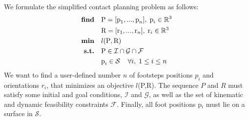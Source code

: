 We formulate the simplified contact planning problem as follows:
\begin{equation}
\label{eq:mip_simple}
\begin{aligned}
    \textrm{\textbf{find}}  \quad & \mbox{P}=[\mbox{p}_1,...,\mbox{p}_n], \;\mbox{p}_i \in \mathbb{R}^{3}\\
                            \quad & \mbox{R}=[\mbox{r}_1,...,\mbox{r}_n], \; \mbox{r}_i \in \mathbb{R}^{3}\\
    \textrm{\textbf{min}}  \quad & l(\mbox{P},\mbox{R})\\
    \textrm{\textbf{s.t.}}  \quad & \mbox{P} \in  \mathcal{I} \cap \mathcal{G} \cap \mathcal{F} \\
                            \quad & \mbox{p}_i \in \mathcal{S} \;\;\;\; \forall i, \; 1 \leq i \leq n
\end{aligned}
\end{equation}
We want to find a user-defined number $n$ of footsteps positions $p_i$ and orientations $r_i$, that minimizes an objective $l$(P,R).
The sequence $P$ and $R$ must satisfy some initial and goal conditions, $\mathcal{I}$ and $\mathcal{G}$, as well as the set of kinematic and dynamic feasibility constraints $\mathcal{F}$.
Finally, all foot positions p$_i$ must lie on a surface in $\mathcal{S}$.

